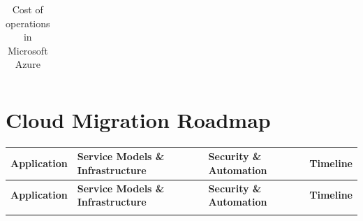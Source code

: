 \documentclass{llncs}
\begin{document}
\begin{table}[htbp]
\begin{tabular}{|l|c|c|c|c|}
    \end{tabular}
    \caption{Cost of operations in Microsoft Azure}
    \label{tab:Cost_Operation_Monthly}
\end{table}

 
\section{Cloud Migration Roadmap}

\begin{longtable}{|p{3.1cm}|p{5.2cm}|p{3.1cm}|l|}
    \hline
    \textbf{Application} & \textbf{Service Models \& Infrastructure} & \textbf{Security \& Automation} & \textbf{Timeline} \\
    \hline
    \endfirsthead
    \hline
    \textbf{Application} & \textbf{Service Models \& Infrastructure} & \textbf{Security \& Automation} & \textbf{Timeline} \\
    \hline
    \endhead
    \hline
    \endfoot
    \hline
    

\end{longtable}
\end{document}
